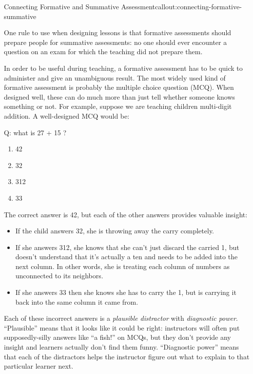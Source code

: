 \begin{callout}{Connecting Formative and Summative Assessment}{callout:connecting-formative-summative}

One rule to use when designing lessons is that formative assessments
should prepare people for summative assessments: no one should ever
encounter a question on an exam for which the teaching did not prepare
them.

\end{callout}

In order to be useful during teaching, a formative assessment has to
be quick to administer and give an unambiguous result. The most widely
used kind of formative assessment is probably the multiple choice
question (MCQ). When designed well, these can do much more than just
tell whether someone knows something or not. For example, suppose we
are teaching children multi-digit addition. A well-designed MCQ would
be:

\begin{example}
\noindent
Q: what is 27 + 15 ?
\begin{enumerate}
\item 42
\item 32
\item 312
\item 33
\end{enumerate}
\end{example}

The correct answer is 42, but each of the other answers provides
valuable insight:

\begin{itemize}

\item
  If the child answers 32, she is throwing away the carry completely.

\item
  If she answers 312, she knows that she can't just discard the
  carried 1, but doesn't understand that it's actually a ten and needs
  to be added into the next column. In other words, she is treating
  each column of numbers as unconnected to its neighbors.

\item
  If she answers 33 then she knows she has to carry the 1, but is
  carrying it back into the same column it came from.

\end{itemize}

Each of these incorrect answers is a \emph{plausible distractor} with
\emph{diagnostic power}.   ``Plausible'' means that it looks like it
could be right: instructors will often put supposedly-silly answers
like ``a fish!'' on MCQs, but they don't provide any insight and
learners actually don't find them funny. ``Diagnostic power'' means
that each of the distractors helps the instructor figure out what to
explain to that particular learner next.

